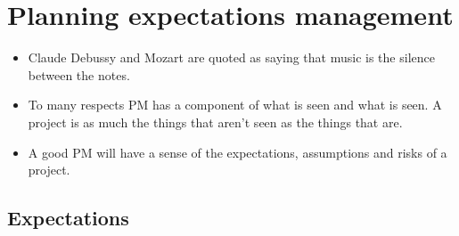 \section{Planning expectations management}
\begin{itemize}
    \item Claude Debussy and Mozart are quoted as saying that music is the silence between the notes.
    \item To many respects PM has a component of what is seen and what is seen. A project is as much the things that aren't seen as the things that are.
    \item A good PM will have a sense of the expectations, assumptions and risks of a project.
\end{itemize}

\subsection{Expectations}
